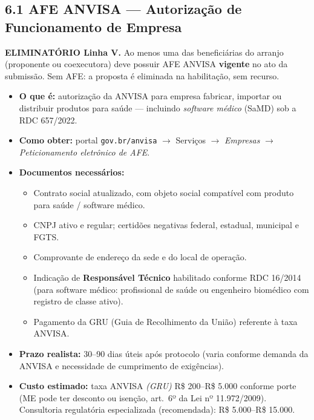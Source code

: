 \documentclass[11pt, a4paper]{article}
\newcommand{\destaque}[2]{%
    \vspace{2pt}
    \colorbox{#1!10}{%
        \parbox{\dimexpr\textwidth-2\fboxsep}{%
            \small #2%
        }%
    }
    \vspace{4pt}
}
\begin{document}
\subsection{6.1 AFE ANVISA --- Autorização de Funcionamento de Empresa}

\destaque{accentColor}{%
    \textcolor{accentColor}{\textbf{ELIMINATÓRIO Linha V.}} Ao menos uma das beneficiárias do arranjo (proponente ou coexecutora) deve possuir AFE ANVISA \textbf{vigente} no ato da submissão. Sem AFE: a proposta é eliminada na habilitação, sem recurso.%
}

\begin{itemize}[label=\textcolor{primaryColor}{$\blacktriangleright$}, leftmargin=1.6em]
    \item \textbf{O que é:} autorização da ANVISA para empresa fabricar, importar ou distribuir produtos para saúde --- incluindo \textit{software médico} (SaMD) sob a RDC 657/2022.
    \item \textbf{Como obter:} portal \texttt{gov.br/anvisa} $\to$ Serviços $\to$ \emph{Empresas} $\to$ \emph{Peticionamento eletrônico de AFE}.
    \item \textbf{Documentos necessários:}
    \begin{itemize}[label=$\circ$, leftmargin=1.4em]
        \item Contrato social atualizado, com objeto social compatível com produto para saúde / software médico.
        \item CNPJ ativo e regular; certidões negativas federal, estadual, municipal e FGTS.
        \item Comprovante de endereço da sede e do local de operação.
        \item Indicação de \textbf{Responsável Técnico} habilitado conforme RDC 16/2014 (para software médico: profissional de saúde ou engenheiro biomédico com registro de classe ativo).
        \item Pagamento da GRU (Guia de Recolhimento da União) referente à taxa ANVISA.
    \end{itemize}
    \item \textbf{Prazo realista:} 30--90 dias úteis após protocolo (varia conforme demanda da ANVISA e necessidade de cumprimento de exigências).
    \item \textbf{Custo estimado:} taxa ANVISA \emph{(GRU)} R\$ 200--R\$ 5.000 conforme porte (ME pode ter desconto ou isenção, art.\ 6º da Lei nº 11.972/2009). Consultoria regulatória especializada (recomendada): R\$ 5.000--R\$ 15.000.

\end{itemize}
\end{document}
